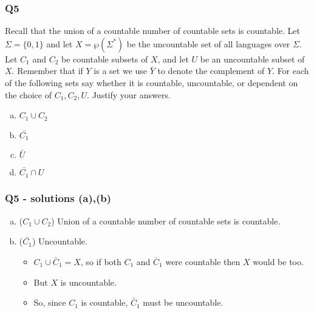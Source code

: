 \documentclass[handout]{beamer}
\begin{document}
\begin{frame}
\frametitle{Q5}
Recall that the union of a countable number of countable sets is countable. Let $\Sigma=\{0,1\}$ and let $X=\wp(\Sigma^*)$ be the uncountable set of all languages over $\Sigma$. Let $C_1$ and $C_2$ be countable subsets of $X$, and let $U$ be an uncountable subset of $X$. Remember that if $Y$ is a set we use $\bar{Y}$ to denote the complement of $Y$. For each of the following sets say whether it is countable, uncountable, or dependent on the choice of $C_1,C_2,U$. Justify your answers.
\begin{enumerate}[(a)]
\item$C_1\cup C_2$
\item$\bar{C_1}$
\item$\bar{U}$
\item$\bar{C_1}\cap U$
\end{enumerate} 
\end{frame}

\begin{frame}
\frametitle{Q5 - solutions (a),(b)}
\vspace{0.7cm}
\begin{enumerate}[(a)]
\item ($C_1\cup C_2$) Union of a countable number of countable sets is countable.
\vspace{0.5cm}
\item ($\bar{C_1}$) Uncountable.
\vspace{0.3cm}
\begin{itemize}
\item   $C_1\cup \bar{C}_1 = X$, so if both $C_1$ and $\bar{C}_1$ were countable then $X$ would be too.
\vspace{0.3cm}
\item But $X$ is uncountable. 
\vspace{0.3cm}
\item So, since $C_1$ is countable, $\bar{C}_1$ must be uncountable.
\end{itemize} 
\end{enumerate}
\end{frame}
\end{document}
